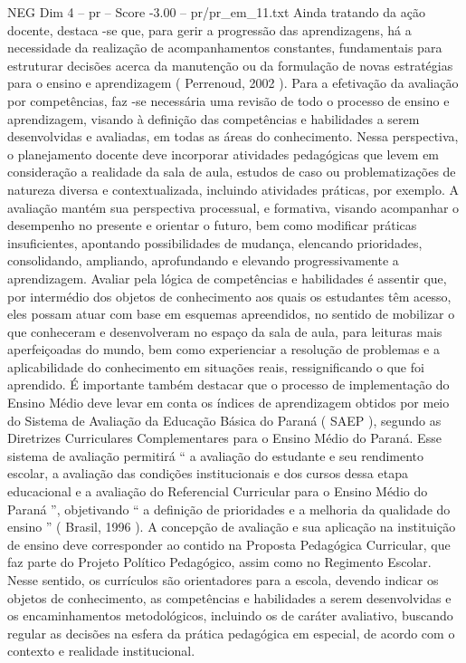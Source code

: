 \begin{textsample}{NEG Dim 4 – pr – Score -3.00 – pr/pr\_em\_11.txt}
Ainda tratando da ação docente, destaca -se que, para gerir a progressão das aprendizagens, há a necessidade da realização de acompanhamentos constantes, fundamentais para estruturar decisões acerca da manutenção ou da formulação de novas estratégias para o ensino e aprendizagem ( Perrenoud, 2002 ).
Para a efetivação da avaliação por competências, faz -se necessária uma revisão de todo o processo de ensino e aprendizagem, visando à definição das competências e habilidades a serem desenvolvidas e avaliadas, em todas as áreas do conhecimento.
Nessa perspectiva, o planejamento docente deve incorporar atividades pedagógicas que levem em consideração a realidade da sala de aula, estudos de caso ou problematizações de natureza diversa e contextualizada, incluindo atividades práticas, por exemplo.
A avaliação mantém sua perspectiva processual, e formativa, visando acompanhar o desempenho no presente e orientar o futuro, bem como modificar práticas insuficientes, apontando possibilidades de mudança, elencando prioridades, consolidando, ampliando, aprofundando e elevando progressivamente a aprendizagem.
Avaliar pela lógica de competências e habilidades é assentir que, por intermédio dos objetos de conhecimento aos quais os estudantes têm acesso, eles possam atuar com base em esquemas apreendidos, no sentido de mobilizar o que conheceram e desenvolveram no espaço da sala de aula, para leituras mais aperfeiçoadas do mundo, bem como experienciar a resolução de problemas e a aplicabilidade do conhecimento em situações reais, ressignificando o que foi aprendido.
É importante também destacar que o processo de implementação do Ensino Médio deve levar em conta os índices de aprendizagem obtidos por meio do Sistema de Avaliação da Educação Básica do Paraná ( SAEP ), segundo as Diretrizes Curriculares Complementares para o Ensino Médio do Paraná.
Esse sistema de avaliação permitirá “ a avaliação do estudante e seu rendimento escolar, a avaliação das condições institucionais e dos cursos dessa etapa educacional e a avaliação do Referencial Curricular para o Ensino Médio do Paraná ”, objetivando “ a definição de prioridades e a melhoria da qualidade do ensino ” ( Brasil, 1996 ).
A concepção de avaliação e sua aplicação na instituição de ensino deve corresponder ao contido na Proposta Pedagógica Curricular, que faz parte do Projeto Político Pedagógico, assim como no Regimento Escolar.
Nesse sentido, os currículos são orientadores para a escola, devendo indicar os objetos de conhecimento, as competências e habilidades a serem desenvolvidas e os encaminhamentos metodológicos, incluindo os de caráter avaliativo, buscando regular as decisões na esfera da prática pedagógica em especial, de acordo com o contexto e realidade institucional.

\end{textsample}
